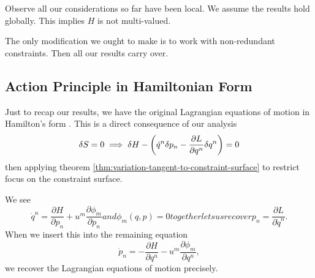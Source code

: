 Observe all our considerations so far have been local. We assume the
results hold globally. This implies $H$ is not multi-valued.

The only modification we ought to make is to work with non-redundant
constraints. Then all our results carry over.

\subsection{Action Principle in Hamiltonian Form}
Just to recap our results, we have the original Lagrangian equations of
motion in Hamilton's form
. This is a direct consequence
of our analysis
\begin{equation}
  \delta\action=0%
  \implies\delta H
  -\left(\dot{q}^{n}\delta p_{n}
         -\frac{\partial L}{\partial q^{n}}\delta q^{n}\right)=0
\end{equation}
then applying theorem \ref{thm:variation-tangent-to-constraint-surface}
to restrict focus on the constraint surface.

We see
\begin{subequations}
\begin{equation}
\dot{q}^{n}=\frac{\partial H}{\partial p_{n}} +
u^{m}\frac{\partial\phi_{m}}{\partial p_{n}}
\end{equation}
and
\begin{equation}
\phi_{m}(q,p)=0
\end{equation}
together lets us recover
\begin{equation}
p_{n} = \frac{\partial L}{\partial\dot{q}^{n}}.
\end{equation}
\end{subequations}
When we insert this into the remaining equation
\begin{equation}
\dot{p}_{n} = -\frac{\partial H}{\partial q^{n}}-u^{m}\frac{\partial\phi_{m}}{\partial q^{n}},
\end{equation}
we recover the Lagrangian equations of motion precisely.

